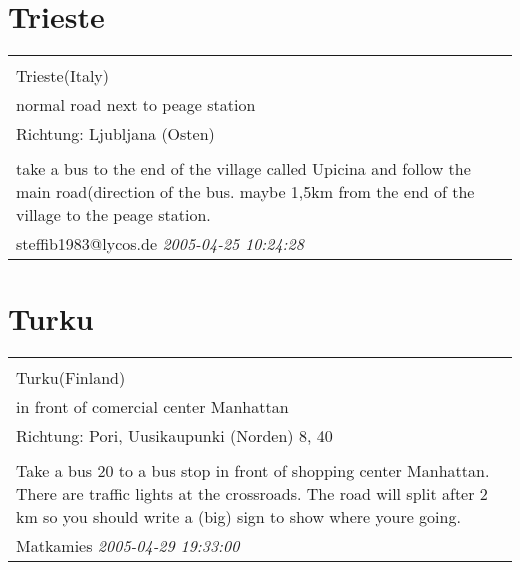 \documentclass[a4paper,12pt]{article}
\begin{document}
\section{Trieste}
\begin{tabular}{|p{13cm}|}
\hline\\
Trieste(Italy)\\
normal road next to peage station\\
Richtung: Ljubljana (Osten) \\
\hline\\
take a bus to the end of the village called Upicina and follow the main road(direction of the bus. maybe 1,5km from the end of the village to the peage station. \\
steffib1983@lycos.de \textit{ 2005-04-25 10:24:28 }\\\hline
\end{tabular}


\section{Turku}
\begin{tabular}{|p{13cm}|}
\hline\\
Turku(Finland)\\
in front of comercial center Manhattan\\
Richtung: Pori, Uusikaupunki (Norden) 8, 40 \\
\hline\\
Take a bus 20 to a bus stop in front of shopping center Manhattan. There are traffic lights at the crossroads. The road will split after 2 km so you should write a (big) sign to show where youre going. \\
Matkamies \textit{ 2005-04-29 19:33:00 }\\\hline
\end{tabular}
\end{document}
